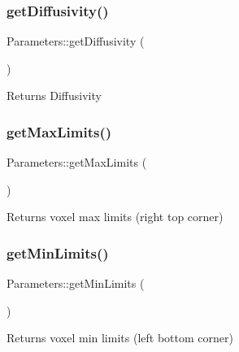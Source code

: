 \subsubsection{\texorpdfstring{get\+Diffusivity()}{getDiffusivity()}}
{\footnotesize\ttfamily Parameters\+::get\+Diffusivity (\begin{DoxyParamCaption}{ }\end{DoxyParamCaption})}

\begin{DoxyReturn}{Returns}
Diffusivity 
\end{DoxyReturn}
\mbox{\label{class_parameters_ad4f8b826db4c1b665891740469e41086}} 
\subsubsection{\texorpdfstring{get\+Max\+Limits()}{getMaxLimits()}}
{\footnotesize\ttfamily Parameters\+::get\+Max\+Limits (\begin{DoxyParamCaption}{ }\end{DoxyParamCaption})}

\begin{DoxyReturn}{Returns}
voxel max limits (right top corner) 
\end{DoxyReturn}
\mbox{\label{class_parameters_abda8b91e5ac40e67c79184d7071c353a}} 
\subsubsection{\texorpdfstring{get\+Min\+Limits()}{getMinLimits()}}
{\footnotesize\ttfamily Parameters\+::get\+Min\+Limits (\begin{DoxyParamCaption}{ }\end{DoxyParamCaption})}

\begin{DoxyReturn}{Returns}
voxel min limits (left bottom corner) 
\end{DoxyReturn}
\mbox{\label{class_parameters_aa5aaf80e0189c63090e8f04cf485800f}} 
